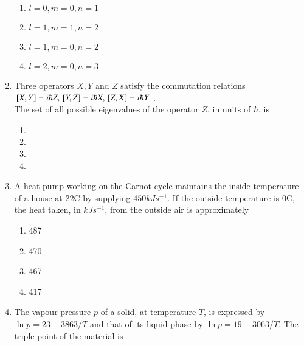 \documentclass[journal]{IEEEtran}
\begin{document}
\begin{enumerate}[start=35]
\begin{multicols}{2}
    \begin{enumerate}
        \item $l=0,m=0,n=1$
        \item $l=1,m=1,n=2$
        \item $l=1,m=0,n=2$
        \item $l=2,m=0,n=3$
    \end{enumerate}
\end{multicols}
\item  Three operators $X,Y$ and $Z$ satisfy the commutation relations\\ ${}\left[X,Y\right]=i\hbar Z,{}\left[Y, Z\right]=i\hbar X,{}\left[Z, X\right]=i\hbar Y$ .\\The set of all possible eigenvalues of the operator $Z$, in units of $\hbar$, is
\begin{multicols}{2}
    \begin{enumerate}
        \item {}
        \item {}
        \item {}
        \item {}
    \end{enumerate}
\end{multicols}
\item A heat pump working on the Carnot cycle maintains the inside temperature of a house at 22\degree C by supplying $450 kJ s^{-1}$. If the outside temperature is 0\degree C, the heat taken, in $kJ s^{-1}$, from the outside air is approximately
\begin{multicols}{4}
    \begin{enumerate}
        \item 487
        \item 470
        \item 467
        \item 417
    \end{enumerate}
\end{multicols}
\item The vapour pressure $p$  of a solid, at temperature $T$, is expressed by $\ln p = 23-3863/T$ and that of its liquid phase by $\ln p = 19-3063/T$. The triple point of the material is
\begin{multicols}{4}
    \begin{enumerate}

\end{enumerate}
\end{multicols}
\end{enumerate}
\end{document}
